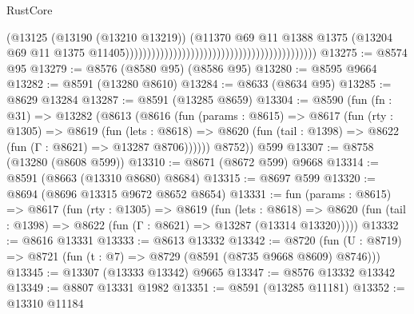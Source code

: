 \begin{lexlean}{RustCore}
\begin{coremodule}
                                                                                      (@13125
                                                                                        (@13190
                                                                                          (@13210
                                                                                            @13219))
                                                                                        (@11370
                                                                                          @69
                                                                                          @11
                                                                                          @1388
                                                                                          @1375
                                                                                          (@13204
                                                                                            @69
                                                                                            @11
                                                                                            @1375
                                                                                            @11405))))))))))))))))))))))))))))))))))))))))))))
@13275 := @8574 @95
@13279 := @8576 (@8580 @95) (@8586 @95)
@13280 := @8595 @9664
@13282 := @8591 (@13280 @8610)
@13284 := @8633 (@8634 @95)
@13285 := @8629 @13284
@13287 := @8591 (@13285 @8659)
@13304 := @8590
    (fun (fn : @31) =>
    @13282
      (@8613
        (@8616
          (fun (params : @8615) =>
          @8617
            (fun (rty : @1305) =>
            @8619
              (fun (lets : @8618) =>
              @8620 (fun (tail : @1398) => @8622 (fun (Γ : @8621) => @13287 @8706))))))
        @8752))
    @599
@13307 := @8758 (@13280 (@8608 @599))
@13310 := @8671 (@8672 @599) @9668
@13314 := @8591 (@8663 (@13310 @8680) @8684)
@13315 := @8697 @599
@13320 := @8694 (@8696 @13315 @9672 @8652 @8654)
@13331 := fun (params : @8615) =>
  @8617
    (fun (rty : @1305) =>
    @8619
      (fun (lets : @8618) =>
      @8620 (fun (tail : @1398) => @8622 (fun (Γ : @8621) => @13287 (@13314 @13320)))))
@13332 := @8616 @13331
@13333 := @8613 @13332
@13342 := @8720 (fun (U : @8719) => @8721 (fun (t : @7) => @8729 (@8591 (@8735 @9668 @8609) @8746)))
@13345 := @13307 (@13333 @13342) @9665
@13347 := @8576 @13332 @13342
@13349 := @8807 @13331 @1982
@13351 := @8591 (@13285 @11181)
@13352 := @13310 @11184

\end{coremodule}
\end{lexlean}
